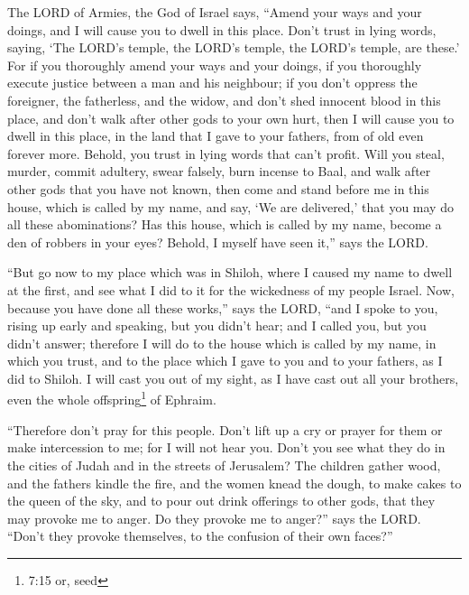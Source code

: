  The LORD of Armies, the God of Israel says, ``Amend your
ways and your doings, and I will cause you to dwell in this place.
 Don't trust in lying words, saying, `The LORD's temple, the
LORD's temple, the LORD's temple, are these.'  For if you
thoroughly amend your ways and your doings, if you thoroughly execute
justice between a man and his neighbour;  if you don't
oppress the foreigner, the fatherless, and the widow, and don't shed
innocent blood in this place, and don't walk after other gods to your
own hurt,  then I will cause you to dwell in this place, in
the land that I gave to your fathers, from of old even forever more.
 Behold, you trust in lying words that can't profit.
 Will you steal, murder, commit adultery, swear falsely,
burn incense to Baal, and walk after other gods that you have not known,
 then come and stand before me in this house, which is
called by my name, and say, `We are delivered,' that you may do all
these abominations?  Has this house, which is called by my
name, become a den of robbers in your eyes? Behold, I myself have seen
it,'' says the LORD.

 ``But go now to my place which was in Shiloh, where I
caused my name to dwell at the first, and see what I did to it for the
wickedness of my people Israel.  Now, because you have done
all these works,'' says the LORD, ``and I spoke to you, rising up early
and speaking, but you didn't hear; and I called you, but you didn't
answer;  therefore I will do to the house which is called
by my name, in which you trust, and to the place which I gave to you and
to your fathers, as I did to Shiloh.  I will cast you out
of my sight, as I have cast out all your brothers, even the whole
offspring\footnote{7:15 or, seed} of Ephraim.

 ``Therefore don't pray for this people. Don't lift up a
cry or prayer for them or make intercession to me; for I will not hear
you.  Don't you see what they do in the cities of Judah and
in the streets of Jerusalem?  The children gather wood, and
the fathers kindle the fire, and the women knead the dough, to make
cakes to the queen of the sky, and to pour out drink offerings to other
gods, that they may provoke me to anger.  Do they provoke
me to anger?'' says the LORD. ``Don't they provoke themselves, to the
confusion of their own faces?''

